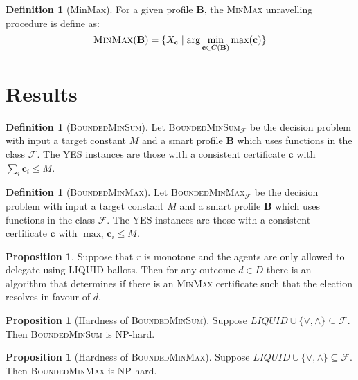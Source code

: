 \documentclass[11pt,a4paper, titlepage]{article}
\theoremstyle{definition}
\newtheorem{definition}[theorem]{Definition}
\newtheorem{proposition}[theorem]{Proposition}
\let\vec\mathbf
\begin{document}
\begin{definition}[MinMax]
    For a given profile $\mathbf{B}$, the \textsc{MinMax} unravelling procedure is define as:
    \[
        \textsc{MinMax}(\mathbf{B}) = \{X_{\mathbf{c}} \mid \mathrm{arg} \min_{\mathbf{c} \in C(\mathbf{B})} \max (\mathbf{c}) \}
    \]
\end{definition}



\newpage



\section{Results}

\begin{definition}[\textsc{BoundedMinSum}]
    Let \textsc{BoundedMinSum}$_\mathcal{F}$ be the decision problem with input a target constant $M$ and a smart profile $\mathbf{B}$ which uses functions in the class $\mathcal{F}$. The YES instances are those with a consistent certificate  $\vec{c}$ with $\sum_i \vec{c}_i \leq M$. 
\end{definition}

\begin{definition}[\textsc{BoundedMinMax}]
    Let \textsc{BoundedMinMax}$_\mathcal{F}$ be the decision problem with input a target constant $M$ and a smart profile $\mathbf{B}$ which uses functions in the class $\mathcal{F}$. The YES instances are those with a consistent certificate  $\vec{c}$ with $\max_i \vec{c}_i \leq M$. 
\end{definition}

\begin{proposition}
    Suppose that $r$ is monotone and the agents are only allowed to delegate using LIQUID ballots. Then for any outcome $d \in D$ there is an algorithm that determines if there is an \textsc{MinMax} certificate such that the election resolves in favour of $d$.
\end{proposition}

\begin{proposition}[Hardness of \textsc{BoundedMinSum}]
    Suppose $\mathit{LIQUID} \cup \{\lor, \land\} \subseteq \mathcal{F}$. Then \textsc{BoundedMinSum} is NP-hard.
\end{proposition}

\begin{proposition}[Hardness of \textsc{BoundedMinMax}]
    Suppose $\mathit{LIQUID} \cup \{\lor, \land\} \subseteq \mathcal{F}$. Then \textsc{BoundedMinMax} is NP-hard.    
\end{proposition}
\end{document}
